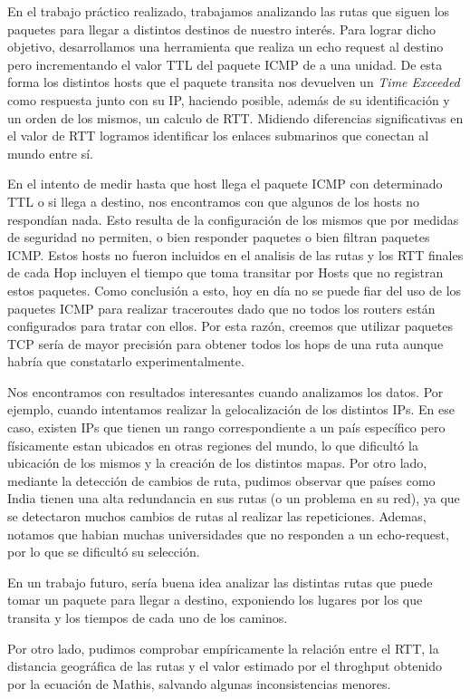 En el trabajo práctico realizado, trabajamos analizando las rutas que siguen los paquetes para llegar a distintos destinos de nuestro interés. Para lograr dicho objetivo, desarrollamos una herramienta que realiza un echo request al destino pero incrementando el valor TTL del paquete ICMP de a una unidad. De esta forma los distintos hosts que el paquete transita nos devuelven un \textit{Time Exceeded} como respuesta junto con su IP, haciendo posible, además de su identificación y un orden de los mismos, un calculo de RTT. Midiendo diferencias significativas en el valor de RTT logramos identificar los enlaces submarinos que conectan al mundo entre sí.

En el intento de medir hasta que host llega el paquete ICMP con determinado TTL o si llega a destino, nos encontramos con que algunos de los hosts no respondían nada. Esto resulta de la configuración de los mismos que por medidas de seguridad no permiten, o bien responder paquetes o bien filtran paquetes ICMP. Estos hosts no fueron incluidos en el analisis de las rutas y los RTT finales de cada Hop incluyen el tiempo que toma transitar por Hosts que no registran estos paquetes. Como conclusión a esto, hoy en día no se puede fiar del uso de los paquetes ICMP para realizar traceroutes dado que no todos los routers están configurados para tratar con ellos. Por esta razón, creemos que utilizar paquetes TCP sería de mayor precisión para obtener todos los hops de una ruta aunque habría que constatarlo experimentalmente.

Nos encontramos con resultados interesantes cuando analizamos los datos. Por ejemplo, cuando intentamos realizar la gelocalización de los distintos IPs. En ese caso, existen IPs que tienen un rango correspondiente a un país específico pero físicamente estan ubicados en otras regiones del mundo, lo que dificultó la ubicación de los mismos y la creación de los distintos mapas. Por otro lado, mediante la detección de cambios de ruta, pudimos observar que países como India tienen una alta redundancia en sus rutas (o un problema en su red), ya que se detectaron muchos cambios de rutas al realizar las repeticiones. Ademas, notamos que habian muchas universidades que no responden a un echo-request, por lo que se dificultó su selección.

En un trabajo futuro, sería buena idea analizar las distintas rutas que puede tomar un paquete para llegar a destino, exponiendo los lugares por los que transita y los tiempos de cada uno de los caminos.

Por otro lado, pudimos comprobar empíricamente la relación entre el RTT, la distancia geográfica de las rutas y el valor estimado por el throghput obtenido por la ecuación de Mathis, salvando algunas inconsistencias menores.